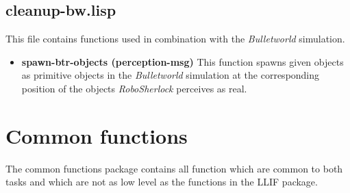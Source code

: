 \documentclass[main.tex]{subfiles}
\begin{document}
	    \subsection{cleanup-bw.lisp}
        This file contains functions used in combination with the \textit{Bulletworld} simulation.
		\begin{itemize}
			\item \textbf{spawn-btr-objects (perception-msg)}
			This function spawns given objects as primitive objects in the \textit{Bulletworld} simulation at the corresponding position of the objects \textit{RoboSherlock} perceives as real.
		\end{itemize}
	  	
	  	\section{Common functions}
	  	\label{comf}
	  	
		The common functions package contains all function which are common to both tasks and which are not as low level as the functions in the LLIF package.
\end{document}
